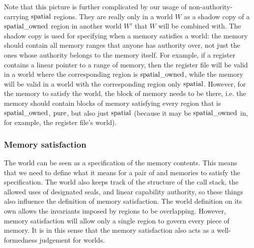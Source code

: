 \begin{jversion}
Note that this picture is further complicated by our usage of non-authority-carrying $\mathrm{spatial}$ regions.
They are really only in a world $W$ as a shadow copy of a $\mathrm{spatial\_owned}$ region in another world $W'$ that $W$ will be combined with.
The shadow copy is used for specifying when a memory satisfies a world: the memory should contain all memory ranges that anyone has authority over, not just the ones whose authority belongs to the memory itself.
For example, if a register contains a linear pointer to a range of memory, then the register file will be valid in a world where the corresponding region is $\mathrm{spatial\_owned}$, while the memory will be valid in a world with the corresponding region only $\mathrm{spatial}$.
However, for the memory to satisfy the world, the block of memory needs to be there, i.e. the memory should contain blocks of memory satisfying every region that is $\mathrm{spatial\_owned}$, $\mathrm{pure}$, but also just $\mathrm{spatial}$ (because it may be $\mathrm{spatial\_owned}$ in, for example, the register file's world).

\subsubsection{Memory satisfaction}
\label{subsubsec:mem-sat}
The world can be seen as a specification of the memory contents.
This means that we need to define what it means for a pair of \trgcm{} and \srccm{} memories to satisfy the specification.
The world also keeps track of the structure of the call stack, the allowed uses of designated seals, and linear capability authority, so these things also influence the definition of memory satisfaction.
The world definition on its own allows the invariants imposed by regions to be overlapping.
However, memory satisfaction will allow only a single region to govern every piece of memory.
It is in this sense that the memory satisfaction also acts as a well-formedness judgement for worlds.



\end{jversion}
